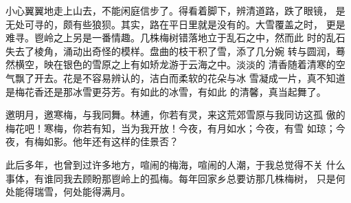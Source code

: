 小心翼翼地走上山去，不能闲庭信步了。得看着脚下，辨清道路，跌了眼镜，
是无处可寻的，颇有些狼狈。其实，路在平日里就是没有的。大雪覆盖之时，
更是难寻。鬯岭之上另是一番情趣。几株梅树错落地立于乱石之中，然而此
时的乱石失去了棱角，涌动出奇怪的模样。盘曲的枝干积了雪，添了几分婉
转与圆润，蓦然横空，映在银色的雪原之上有如矫龙游于云海之中。淡淡的
清香随着清寒的空气飘了开去。花是不容易辨认的，洁白而柔软的花朵与冰
雪凝成一片，真不知道是梅花香还是那冰雪更芬芳。有如此的冰雪，有如此
的清馨，真当起舞了。

邀明月，邀寒梅，与我同舞。林逋，你若有灵，来这荒郊雪原与我同访这孤
傲的梅花吧！寒梅，你若有知，当为我开放！今夜，有月如水；今夜，有雪
如琼；今夜，有梅如影。他年还有这样的佳景否？

此后多年，也曾到过许多地方，喧闹的梅海，喧闹的人潮，于我总觉得不关
什么事体，有谁同我去顾盼那鬯岭上的孤梅。每年回家乡总要访那几株梅树，
只是何处能得瑞雪，何处能得满月。
